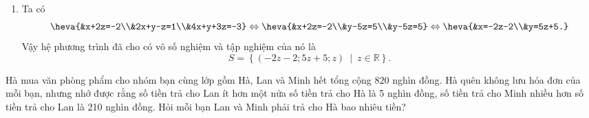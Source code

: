 \begin{bt}
{\begin{enumerate}
$$\begin{aligned}
	\end{aligned}$$
	Từ hai phương trình cuối, ta suy ra $0=1$,  điều này vô lí.\\
	Vậy hệ phương trình đã cho vô nghiệm.
	\item Ta có
	$$\heva{&x+2z=-2\\&2x+y-z=1\\&4x+y+3z=-3} \Leftrightarrow \heva{&x+2z=-2\\&y-5z=5\\&y-5z=5} \Leftrightarrow \heva{&x=-2z-2\\&y=5z+5.}$$
	Vậy hệ phương trình đã cho có vô số nghiệm và tập nghiệm của nó là
	\[S=\left\{(-2z-2;5z+5;z)\ \middle |\ z\in\mathbb{R}\right\}.\]
\end{enumerate}
}
\end{bt}
\begin{bt}%
	Hà mua văn phòng phẩm cho nhóm bạn cùng lớp gồm Hà, Lan và Minh hết tổng cộng $820$ nghìn đồng. Hà quên không lưu hóa đơn của mỗi bạn, nhưng nhớ được rằng số tiền trả cho Lan ít hơn một nửa số tiền trả cho Hà là 5 nghìn đồng, số tiền trả cho Minh nhiều hơn số tiền trả cho Lan là 210 nghìn đồng. Hỏi mỗi bạn Lan và Minh phải trả cho Hà bao nhiêu tiền?
\end{bt}
